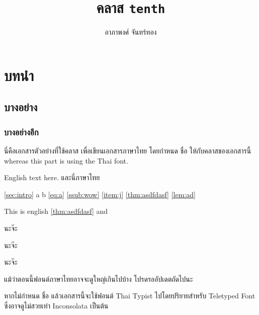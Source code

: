 \documentclass[11pt,twoside,thai,thainumbering]{tenth}
\title{คลาส \texttt{tenth}}
\author{อาภาพงศ์ จันทร์ทอง}
\begin{document}
    \maketitle

    \section{บทนำ \label{sec:intro}}

    \subsection{บางอย่าง}

    \subsubsection{บางอย่างอีก \label{ssub:wow}}

    นี่คือเอกสารตัวอย่างที่ใช้คลาส  เพื่อเขียนเอกสารภาษาไทย โดยกำหนด  ชื่อ  ให้กับคลาสของเอกสารนี้  whereas this part is using the Thai font.

    \begin{eng}
        English text here. {\tha และนี่ภาษาไทย}
    \end{eng}

    \autoref{sec:intro} a \sectionautorefname{} b \autoref{eq:a} \autoref{ssub:wow} \autoref{item:j}
    \Hfootnoteautorefname{} \AMSautorefname{} \autoref{thm:asdfdasf} \autoref{lem:ad} \lemmaautorefname{}

    { This is english \autoref{thm:asdfdasf} and \chaptername}

    \begin{theorem}
        \label{thm:asdfdasf}
        นะจ๊ะ
    \end{theorem}
    \unskip
    \begin{lemma}
        \label{lem:ad}
        นะจ๊ะ
    \end{lemma}

    \begin{remark}
        นะจ๊ะ
    \end{remark}

    แม้ว่าตอนนี้ฟอนต์ภาษาไทยอาจจะดูใหญ่เกินไปบ้าง โปรดรออัปเดตถัดไปนะ

    หากไม่กำหนด  ชื่อ  แล้วเอกสารนี้จะใช้ฟอนต์ Thai Typist ไปโดยปริยายสำหรับ Teletyped Font ซึ่งอาจดูไม่สวยเท่า Inconsolata เป็นต้น
\end{document}
